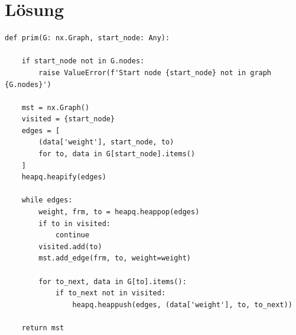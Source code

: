 \documentclass[a4paper,11pt]{report}
\begin{document}
    \section{Lösung}

    \begin{verbatim}
def prim(G: nx.Graph, start_node: Any):

    if start_node not in G.nodes:
        raise ValueError(f'Start node {start_node} not in graph {G.nodes}')

    mst = nx.Graph()
    visited = {start_node}
    edges = [
        (data['weight'], start_node, to)
        for to, data in G[start_node].items()
    ]
    heapq.heapify(edges)

    while edges:
        weight, frm, to = heapq.heappop(edges)
        if to in visited:
            continue
        visited.add(to)
        mst.add_edge(frm, to, weight=weight)

        for to_next, data in G[to].items():
            if to_next not in visited:
                heapq.heappush(edges, (data['weight'], to, to_next))

    return mst
    \end{verbatim}
\end{document}
